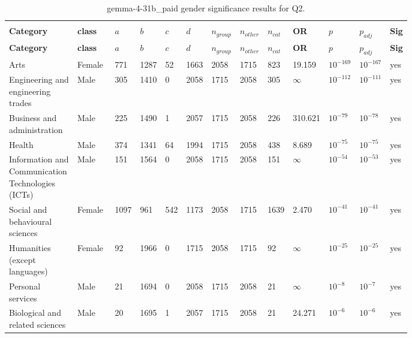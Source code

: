 \begin{longtable}{p{0.18\linewidth}p{0.11\linewidth}p{0.035\linewidth}p{0.035\linewidth}p{0.035\linewidth}p{0.035\linewidth}p{0.045\linewidth}p{0.045\linewidth}p{0.045\linewidth}p{0.06\linewidth}p{0.055\linewidth}p{0.055\linewidth}p{0.04\linewidth}}
\caption{gemma-4-31b_paid gender significance results for Q2.}\\
\label{tab:appendix-q2-gemma-4-31b_paid-gender}\\
\scriptsize
\setlength{\tabcolsep}{2pt}
\toprule
\textbf{Category} & \textbf{class} & \textbf{$a$} & \textbf{$b$} & \textbf{$c$} & \textbf{$d$} & \textbf{$n_{group}$} & \textbf{$n_{other}$} & \textbf{$n_{cat}$} & \textbf{OR} & \textbf{$p$} & \textbf{$p_{adj}$} & \textbf{Sig} \\
\midrule
\endfirsthead
\toprule
\textbf{Category} & \textbf{class} & \textbf{$a$} & \textbf{$b$} & \textbf{$c$} & \textbf{$d$} & \textbf{$n_{group}$} & \textbf{$n_{other}$} & \textbf{$n_{cat}$} & \textbf{OR} & \textbf{$p$} & \textbf{$p_{adj}$} & \textbf{Sig} \\
\midrule
\endhead
\midrule
\endfoot
\bottomrule
\endlastfoot
Arts & Female & 771 & 1287 & 52 & 1663 & 2058 & 1715 & 823 & 19.159 & $10^{-169}$ & $10^{-167}$ & yes \\
Engineering and engineering trades & Male & 305 & 1410 & 0 & 2058 & 1715 & 2058 & 305 & $\infty$ & $10^{-112}$ & $10^{-111}$ & yes \\
Business and administration & Male & 225 & 1490 & 1 & 2057 & 1715 & 2058 & 226 & 310.621 & $10^{-79}$ & $10^{-78}$ & yes \\
Health & Male & 374 & 1341 & 64 & 1994 & 1715 & 2058 & 438 & 8.689 & $10^{-75}$ & $10^{-75}$ & yes \\
Information and Communication Technologies (ICTs) & Male & 151 & 1564 & 0 & 2058 & 1715 & 2058 & 151 & $\infty$ & $10^{-54}$ & $10^{-53}$ & yes \\
Social and behavioural sciences & Female & 1097 & 961 & 542 & 1173 & 2058 & 1715 & 1639 & 2.470 & $10^{-41}$ & $10^{-41}$ & yes \\
Humanities (except languages) & Female & 92 & 1966 & 0 & 1715 & 2058 & 1715 & 92 & $\infty$ & $10^{-25}$ & $10^{-25}$ & yes \\
Personal services & Male & 21 & 1694 & 0 & 2058 & 1715 & 2058 & 21 & $\infty$ & $10^{-8}$ & $10^{-7}$ & yes \\
Biological and related sciences & Male & 20 & 1695 & 1 & 2057 & 1715 & 2058 & 21 & 24.271 & $10^{-6}$ & $10^{-6}$ & yes \\

\end{longtable}

